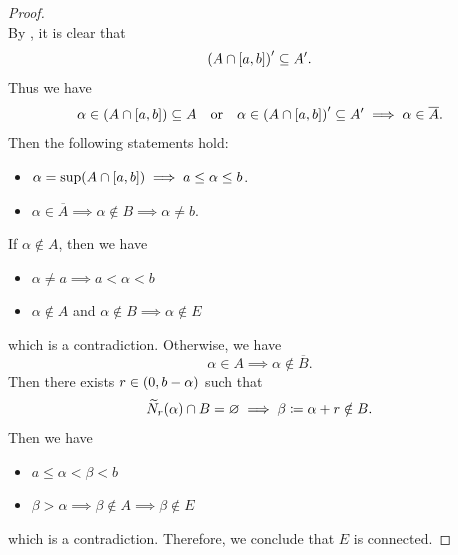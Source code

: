 \begin{proof}
\[    \]
    By , it is clear that
    \[
    \paren*{A \cap [a, b]}' \subseteq A'.
    \]
    Thus we have
    \[
    \alpha \in \paren*{A \cap [a, b]} \subseteq A \quad \text{or} \quad
    \alpha \in \paren*{A \cap [a, b]}' \subseteq A' \implies \alpha \in \overline{A}.
    \]
    Then the following statements hold:
    \begin{itemize}
        \item $\alpha = \sup\paren*{A \cap [a, b]} \implies a \leq \alpha \leq b$.
        \item $\alpha \in \overline{A} \implies \alpha \notin B \implies \alpha \neq b$.
    \end{itemize}
    If $\alpha \notin A$, then we have
    \begin{itemize}
        \item $\alpha \neq a \implies a < \alpha < b$
        \item $\alpha \notin A$ and $\alpha \notin B \implies \alpha \notin E$
    \end{itemize}
    which is a contradiction. Otherwise, we have
    \[
    \alpha \in A \implies \alpha \notin \overline{B}.
    \]
    Then there exists $r \in \paren*{0, b - \alpha}$ such that
    \[
    \widetilde{N}_{r}(\alpha) \cap B = \vnot \implies \beta \coloneqq \alpha + r \notin B.
    \]
    Then we have
    \begin{itemize}
        \item $a \leq \alpha < \beta < b$
        \item $\beta > \alpha \implies \beta \notin A \implies \beta \notin E$
    \end{itemize}
    which is a contradiction. Therefore, we conclude that $E$ is connected.
\end{proof}


